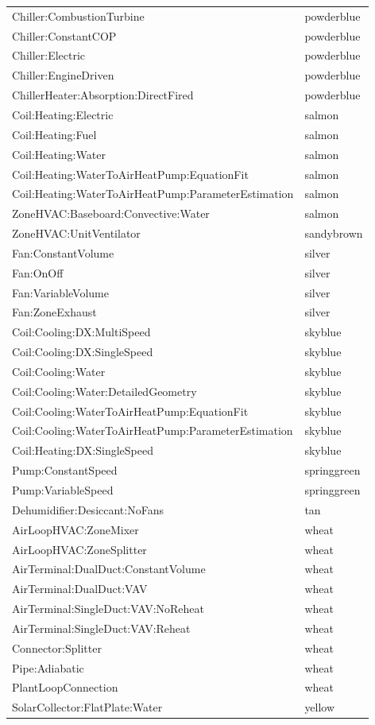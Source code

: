 \begin{longtable}[c]{@{}ll@{}}
Chiller:CombustionTurbine & powderblue \tabularnewline
Chiller:ConstantCOP & powderblue \tabularnewline
Chiller:Electric & powderblue \tabularnewline
Chiller:EngineDriven & powderblue \tabularnewline
ChillerHeater:Absorption:DirectFired & powderblue \tabularnewline
Coil:Heating:Electric & salmon \tabularnewline
Coil:Heating:Fuel & salmon \tabularnewline
Coil:Heating:Water & salmon \tabularnewline
Coil:Heating:WaterToAirHeatPump:EquationFit & salmon \tabularnewline
Coil:Heating:WaterToAirHeatPump:ParameterEstimation & salmon \tabularnewline
ZoneHVAC:Baseboard:Convective:Water & salmon \tabularnewline
ZoneHVAC:UnitVentilator & sandybrown \tabularnewline
Fan:ConstantVolume & silver \tabularnewline
Fan:OnOff & silver \tabularnewline
Fan:VariableVolume & silver \tabularnewline
Fan:ZoneExhaust & silver \tabularnewline
Coil:Cooling:DX:MultiSpeed & skyblue \tabularnewline
Coil:Cooling:DX:SingleSpeed & skyblue \tabularnewline
Coil:Cooling:Water & skyblue \tabularnewline
Coil:Cooling:Water:DetailedGeometry & skyblue \tabularnewline
Coil:Cooling:WaterToAirHeatPump:EquationFit & skyblue \tabularnewline
Coil:Cooling:WaterToAirHeatPump:ParameterEstimation & skyblue \tabularnewline
Coil:Heating:DX:SingleSpeed & skyblue \tabularnewline
Pump:ConstantSpeed & springgreen \tabularnewline
Pump:VariableSpeed & springgreen \tabularnewline
Dehumidifier:Desiccant:NoFans & tan \tabularnewline
AirLoopHVAC:ZoneMixer & wheat \tabularnewline
AirLoopHVAC:ZoneSplitter & wheat \tabularnewline
AirTerminal:DualDuct:ConstantVolume & wheat \tabularnewline
AirTerminal:DualDuct:VAV & wheat \tabularnewline
AirTerminal:SingleDuct:VAV:NoReheat & wheat \tabularnewline
AirTerminal:SingleDuct:VAV:Reheat & wheat \tabularnewline
Connector:Splitter & wheat \tabularnewline
Pipe:Adiabatic & wheat \tabularnewline
PlantLoopConnection & wheat \tabularnewline
SolarCollector:FlatPlate:Water & yellow \tabularnewline
\bottomrule
\end{longtable}
